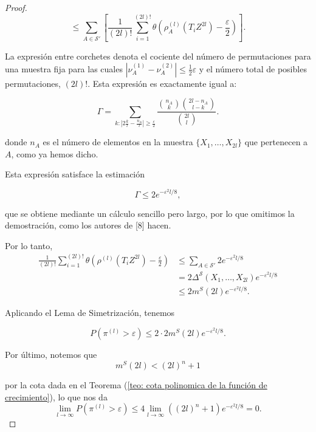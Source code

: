\documentclass{report}
\begin{document}
\begin{proof}
\[
\leq \sum_{A \in \mathcal{S}'} \left[ \frac{1}{(2l)!} \sum_{i=1}^{(2l)!} \theta \left(  \rho^{(l)}_A(T_i Z^{2l}) - \frac{\varepsilon}{2}  \right) \right].
\]

La expresión entre corchetes denota el cociente del número de permutaciones para una muestra fija 
para las cuales \( |\nu^{(1)}_A - \nu^{(2)}_A| \leq \frac{1}{2} \varepsilon \) y el número total de posibles permutaciones, $(2l)!$. Esta expresión
es exactamente igual a:

\[
\Gamma = \sum_{k : |2\frac{k}{l} - \frac{n_A}{l}| \geq \frac{\varepsilon}{2}} \frac{\binom{n_A}{k} \binom{2l - n_A}{l - k}}{\binom{2l}{l}}.
\]

donde \( n_A \) es el número de elementos en la muestra \( \{X_1, \dots, X_{2l}\} \) que pertenecen a \( A \), como ya hemos dicho. \newline 

Esta expresión satisface la estimación 

\[
\Gamma \leq 2 e^{-\varepsilon^2 l / 8},
\]

que se obtiene mediante un cálculo sencillo pero largo, por lo que omitimos la demostración, como los autores de [8] hacen. \newline

Por lo tanto,
\begin{equation*}
\begin{aligned}
\frac{1}{(2l)!} \sum_{i=1}^{(2l)!} \theta \left(  \rho^{(l)}(T_i Z^{2l}) - \frac{\varepsilon}{2} \right) 
&\leq \sum_{A \in \mathcal{S}'} 2 e^{-\varepsilon^2 l / 8} \\
&= 2 \Delta^{\mathcal{S}}(X_1, \dots, X_{2l}) e^{-\varepsilon^2 l / 8}\\
&\leq 2 m^S(2l) e^{-\varepsilon^2 l / 8}.
\end{aligned}
\end{equation*}

Aplicando el Lema de Simetrización, tenemos

\[
P\left(\pi^{(l)}>\varepsilon\right) \leq 2 \cdot 2 m^S(2l) e^{-\varepsilon^2 l / 8}.
\]

Por último, notemos que 
\[
m^S(2l)<(2l)^n + 1
\]

por la cota dada en el Teorema (\ref{teo: cota polinomica de la función de crecimiento}), lo que nos da
\[
\lim_{l\to\infty} P\left(\pi^{(l)}>\varepsilon\right) \leq 4 \lim_{l\to\infty} ((2l)^n+1) e^{-\varepsilon^2 l / 8} = 0.
\]

\end{proof}
\end{document}
